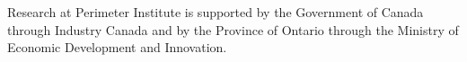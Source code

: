 \clearpage
\begin{acknowledgments}
Research at Perimeter Institute is supported by the Government of Canada through Industry Canada and by the Province of Ontario through the Ministry of Economic Development and Innovation.
\end{acknowledgments}

\setlength{\bibsep}{3pt plus 3pt minus 2pt}

\nocite{apsrev41Control}



